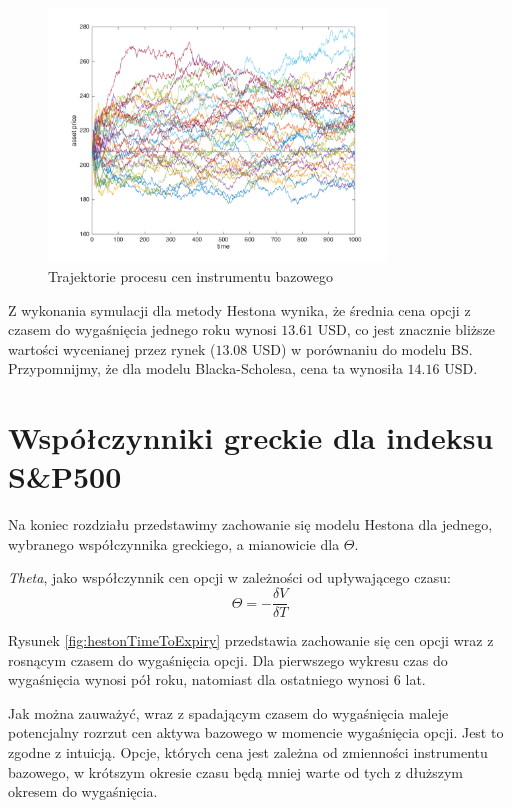 \documentclass{pracamgr}
\begin{document}
\begin{figure}
\centering
  \includegraphics[width=0.80\textwidth]{../chartHeston.png}
  \caption{Trajektorie procesu cen instrumentu bazowego}
  \label{fig:hestonAssetPaths}
\end{figure}


Z wykonania symulacji dla metody Hestona wynika, że średnia cena opcji z czasem do wygaśnięcia 
jednego roku wynosi $13.61$ USD, 
co jest znacznie bliższe wartości wycenianej przez rynek ($13.08$ USD) w porównaniu do modelu BS. 
Przypomnijmy, że dla modelu Blacka-Scholesa, cena ta wynosiła $14.16$ USD.


\section{Współczynniki greckie dla indeksu S\&P500}

Na koniec rozdziału przedstawimy zachowanie się modelu Hestona dla jednego, wybranego współczynnika 
greckiego, a mianowicie dla $\Theta$.

\textit{Theta}, jako współczynnik cen opcji w zależności od upływającego czasu:
\begin{equation}
  \Theta = - \frac{\delta V}{\delta T}
\end{equation}

Rysunek \ref{fig:hestonTimeToExpiry} przedstawia zachowanie się cen opcji wraz z rosnącym czasem do 
wygaśnięcia opcji. Dla pierwszego wykresu czas do wygaśnięcia wynosi pół roku, natomiast dla 
ostatniego wynosi 6 lat. 

Jak można zauważyć, wraz z spadającym czasem do wygaśnięcia maleje potencjalny rozrzut cen aktywa 
bazowego w momencie wygaśnięcia opcji.
Jest to zgodne z intuicją. Opcje, których cena jest zależna od zmienności instrumentu bazowego, 
w krótszym okresie czasu będą mniej warte od tych z dłuższym okresem do wygaśnięcia.
\end{document}
